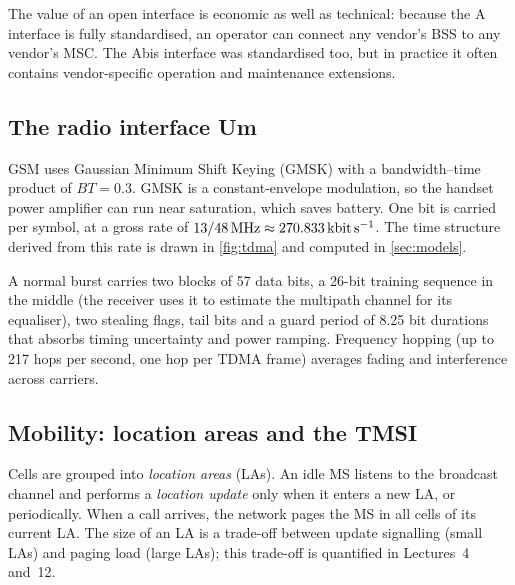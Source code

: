 \documentclass[11pt,a4paper]{article}
\begin{document}
The value of an open interface is economic as well as technical: because the A
interface is fully standardised, an operator can connect any vendor's BSS to any
vendor's MSC. The Abis interface was standardised too, but in practice it often
contains vendor-specific operation and maintenance extensions.

\subsection{The radio interface Um}
GSM uses Gaussian Minimum Shift Keying (GMSK) with a bandwidth--time product of
$BT = 0.3$. GMSK is a constant-envelope modulation, so the handset power amplifier
can run near saturation, which saves battery. One bit is carried per symbol, at a
gross rate of $13/48\,\mathrm{MHz} \approx \qty{270.833}{\kilo\bit\per\second}$. The
time structure derived from this rate is drawn in \cref{fig:tdma} and computed in
\cref{sec:models}.

A normal burst carries two blocks of 57 data bits, a 26-bit training sequence in the
middle (the receiver uses it to estimate the multipath channel for its equaliser),
two stealing flags, tail bits and a guard period of 8.25 bit durations that absorbs
timing uncertainty and power ramping. Frequency hopping (up to 217 hops per second,
one hop per TDMA frame) averages fading and interference across carriers.

\subsection{Mobility: location areas and the TMSI}
Cells are grouped into \emph{location areas} (LAs). An idle MS listens to the
broadcast channel and performs a \emph{location update} only when it enters a new
LA, or periodically. When a call arrives, the network pages the MS in all cells of
its current LA. The size of an LA is a trade-off between update signalling (small
LAs) and paging load (large LAs); this trade-off is quantified in Lectures~4 and~12.
\end{document}
